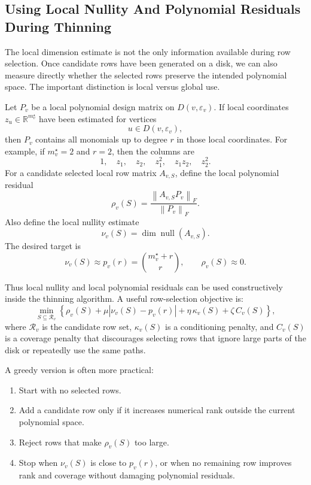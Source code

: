 \documentclass[11pt]{article}
\newcommand{\R}{\mathbb R}
\newcommand{\norm}[1]{\left\lVert #1 \right\rVert}
\newcommand{\nullsp}{\operatorname{null}}
\newcommand{\eps}{\varepsilon}
\begin{document}
\subsection{Using Local Nullity And Polynomial Residuals During Thinning}

The local dimension estimate is not the only information available during row
selection.  Once candidate rows have been generated on a disk, we can also
measure directly whether the selected rows preserve the intended polynomial
space.  The important distinction is local versus global use.

Let \(P_v\) be a local polynomial design matrix on \(D(v,\eps_v)\).  If local
coordinates \(z_u\in\R^{m_v^\star}\) have been estimated for vertices
\[
  u\in D(v,\eps_v),
\]
then \(P_v\) contains all monomials up to degree \(r\) in those local
coordinates.  For example, if \(m_v^\star=2\) and \(r=2\), then the columns are
\[
  1,\quad z_1,\quad z_2,\quad z_1^2,\quad z_1z_2,\quad z_2^2.
\]
For a candidate selected local row matrix \(A_{v,S}\), define the local
polynomial residual
\[
  \rho_v(S)
  =
  \frac{\norm{A_{v,S}P_v}_F}{\norm{P_v}_F}.
\]
Also define the local nullity estimate
\[
  \nu_v(S)=\dim\nullsp(A_{v,S}).
\]
The desired target is
\[
  \nu_v(S)\approx p_v(r)
  =
  \binom{m_v^\star+r}{r},
  \qquad
  \rho_v(S)\approx 0.
\]

Thus local nullity and local polynomial residuals can be used constructively
inside the thinning algorithm.  A useful row-selection objective is:
\[
  \min_{S\subseteq \mathcal R_v}
  \left\{
    \rho_v(S)
    +
    \mu\left|\nu_v(S)-p_v(r)\right|
    +
    \eta\,\kappa_v(S)
    +
    \zeta\,C_v(S)
  \right\},
\]
where \(\mathcal R_v\) is the candidate row set, \(\kappa_v(S)\) is a
conditioning penalty, and \(C_v(S)\) is a coverage penalty that discourages
selecting rows that ignore large parts of the disk or repeatedly use the same
paths.

A greedy version is often more practical:
\begin{enumerate}
  \item Start with no selected rows.
  \item Add a candidate row only if it increases numerical rank outside the
        current polynomial space.
  \item Reject rows that make \(\rho_v(S)\) too large.
  \item Stop when \(\nu_v(S)\) is close to \(p_v(r)\), or when no remaining row
        improves rank and coverage without damaging polynomial residuals.
\end{enumerate}
\end{document}
